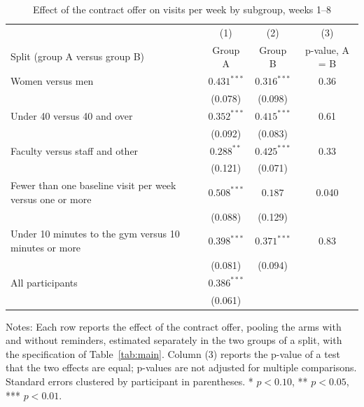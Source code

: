 \begin{table}[t]
\centering
\small
\begin{threeparttable}
\caption{Effect of the contract offer on visits per week by subgroup, weeks 1--8}
\label{tab:het}
\begin{tabular}{@{}p{6.4cm}ccc@{}}
\toprule
 & (1) & (2) & (3) \\
Split (group A versus group B) & Group A & Group B & p-value, A = B \\
\midrule
Women versus men & $0.431^{***}$ & $0.316^{***}$ & 0.36 \\
 & (0.078) & (0.098) & \\
Under 40 versus 40 and over & $0.352^{***}$ & $0.415^{***}$ & 0.61 \\
 & (0.092) & (0.083) & \\
Faculty versus staff and other & $0.288^{**}$ & $0.425^{***}$ & 0.33 \\
 & (0.121) & (0.071) & \\
Fewer than one baseline visit per week versus one or more & $0.508^{***}$ & $0.187$ & 0.040 \\
 & (0.088) & (0.129) & \\
Under 10 minutes to the gym versus 10 minutes or more & $0.398^{***}$ & $0.371^{***}$ & 0.83 \\
 & (0.081) & (0.094) & \\
\midrule
All participants & $0.386^{***}$ & & \\
 & (0.061) & & \\
\bottomrule
\end{tabular}
\begin{tablenotes}
\small
\item[] Notes: Each row reports the effect of the contract offer, pooling the arms with and without reminders, estimated separately in the two groups of a split, with the specification of Table~\ref{tab:main}. Column (3) reports the p-value of a test that the two effects are equal; p-values are not adjusted for multiple comparisons. Standard errors clustered by participant in parentheses. * $p<0.10$, ** $p<0.05$, *** $p<0.01$.
\end{tablenotes}
\end{threeparttable}
\end{table}
